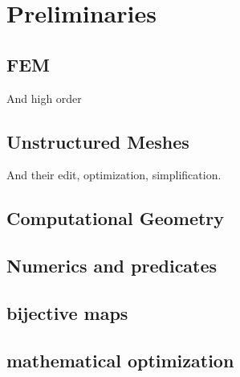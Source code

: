 \section{Preliminaries}
\subsection{FEM}
And high order
\subsection{Unstructured Meshes}
And their edit, optimization, simplification.
\subsection{Computational Geometry}

\subsection{Numerics and predicates}
\subsection{bijective maps}
\subsection{mathematical optimization}
